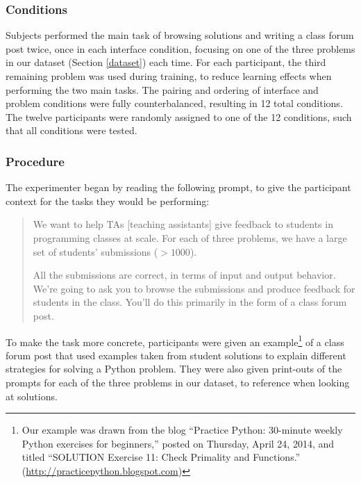 \documentclass[12pt,twoside]{mitthesis}
\providecommand{\DIFaddtex}[1]{{\protect\color{blue}\uwave{#1}}} %
\providecommand{\DIFaddbegin}{} %
\providecommand{\DIFaddend}{} %
\providecommand{\DIFdelbegin}{} %
\providecommand{\DIFdelend}{} %
\providecommand{\DIFadd}[1]{\texorpdfstring{\DIFaddtex{#1}}{#1}} %
\begin{document}
\DIFaddbegin \subsubsection{Conditions}

\DIFaddend Subjects performed the main task of browsing solutions and writing a class forum post twice, once in each interface condition, focusing on one of the three problems in our dataset (Section \ref{dataset}) each time. For each participant, the third remaining problem was used during training, to reduce learning effects when performing the two main tasks. The pairing and ordering of interface and problem conditions were fully counterbalanced, resulting in 12 total conditions. The twelve participants were randomly assigned to one of the 12 conditions, such that all conditions were tested.

\DIFdelbegin %
\DIFdelend \DIFaddbegin \subsubsection{Procedure}
\DIFaddend 

\DIFdelbegin %
\DIFdelend \DIFaddbegin {\bf \DIFadd{Prompt}} \DIFaddend The experimenter began by reading the following prompt, to give the participant context for the tasks they would be performing:

\begin{quote}

We want to help TAs [teaching assistants] give feedback to students in programming classes at scale. For each of three problems, we have a large set of students' submissions ($> 1000$). 

All the submissions are correct, in terms of input and output behavior. We're going to ask you to browse the submissions and produce feedback for students in the class. You'll do this primarily in the form of a class forum post.
\end{quote}

To make the task more concrete, participants were given an example\footnote{Our example was drawn from the blog ``Practice Python: 30-minute weekly Python exercises for beginners,'' posted on Thursday, April 24, 2014, and titled ``SOLUTION Exercise 11: Check Primality and Functions.'' (\url{http://practicepython.blogspot.com})} of a class forum post that used examples taken from student solutions to explain different strategies for solving a Python problem. They were also given print-outs of the prompts for each of the three problems in our dataset, to reference when looking at solutions.
\DIFdelbegin %
\DIFdelend 
\end{document}
